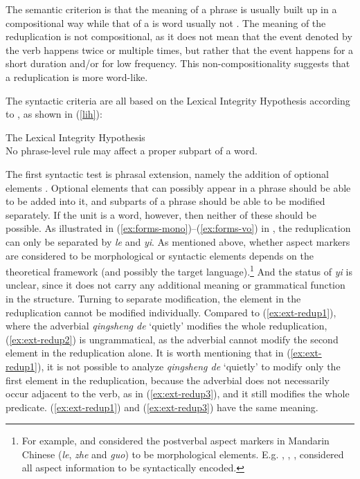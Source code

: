 The semantic criterion is that the meaning of a phrase is usually built up in a compositional way while that of a is word usually not \citetext{\citealp[140]{Duanmu1998}; \citealp[275]{Schaefer2009}}. 
The meaning of the reduplication is not compositional, as it does not mean that the event denoted by the verb happens twice or multiple times, but rather that the event happens for a short duration and/or for low frequency.
This non-compositionality suggests that a reduplication is more word-like.


The syntactic criteria are all based on the Lexical Integrity Hypothesis according to \citet[60]{Huang1984}, as shown in (\ref{lih}):

\ea\label{lih}The Lexical Integrity Hypothesis\\
No phrase-level rule may affect a proper subpart of a word.
\z

The first syntactic test is phrasal extension, namely the addition of optional elements \citetext{\citealp[150]{Duanmu1998}; \citealp[280]{Schaefer2009}}. 
Optional elements that can possibly appear in a phrase should be able to be added into it,
and subparts of a phrase should be able to be modified separately. 
If the unit is a word, however, then neither of these should  be possible.
As illustrated in (\ref{ex:forms-mono})--(\ref{ex:forms-vo}) in , the reduplication can only be separated by \textit{le} and \textit{yi}. 
As mentioned above, whether aspect markers are considered to be morphological or syntactic elements depends on the theoretical framework (and possibly the target language).\footnote{For example, \citet[Sec. 3.3.1]{Huangetal2009} and \citet[246]{MuellerLipenkova2013} considered the postverbal aspect markers  in Mandarin Chinese (\textit{le}, \textit{zhe} and \textit{guo}) to be morphological elements. E.g. \citet{Travis2000}, \citet{Ramchand2008},  \citet[23]{Arcodiaetal2014}, \citet[146]{BascianoMelloni2017} considered all aspect information to be syntactically encoded.} 
And the status of \textit{yi} is unclear, since it does not carry any additional meaning or grammatical function in the structure. %
Turning to separate modification,  the element in the reduplication cannot be modified individually. 
Compared to (\ref{ex:ext-redup1}), where the adverbial \textit{qingsheng de} `quietly' modifies the whole reduplication, (\ref{ex:ext-redup2}) is ungrammatical, 
as the adverbial cannot modify the second element in the reduplication alone.
It is worth mentioning that in (\ref{ex:ext-redup1}), it is not possible to analyze \textit{qingsheng de} `quietly' to modify only the first element in the reduplication, 
because the adverbial does not necessarily occur adjacent to the verb, as in (\ref{ex:ext-redup3}), 
and it still modifies the whole predicate.
(\ref{ex:ext-redup1}) and  (\ref{ex:ext-redup3}) have the same meaning.

